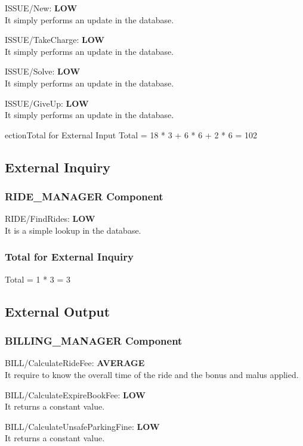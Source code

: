 \documentclass[11pt]{article} %
\newcommand{\extInput}[3]{ #1:  \textbf{#2} \\ #3  }
\begin{document}
\begin{description}
	\item \extInput
		{ISSUE/New}
		{LOW}
		{It simply performs an update in the database.}
	\item \extInput
		{ISSUE/TakeCharge}
		{LOW}
		{It simply performs an update in the database.}
	\item \extInput
		{ISSUE/Solve}
		{LOW}
		{It simply performs an update in the database.}
	\item \extInput
		{ISSUE/GiveUp}
		{LOW}
		{It simply performs an update in the database.}
\end{description}

\subsubs
ection{Total for External Input}
Total = 18 * 3 + 6 * 6 + 2 * 6 =  102

\subsection{External Inquiry}

\subsubsection{RIDE\_MANAGER Component}
\begin{description}
	\item \extInput
		{RIDE/FindRides}
		{LOW}
		{It is a simple lookup in the database.}
\end{description}

\subsubsection{Total for External Inquiry}
Total = 1 * 3 = 3

\subsection{External Output}

\subsubsection{BILLING\_MANAGER Component}
\begin{description}
	\item \extInput
		{BILL/CalculateRideFee}
		{AVERAGE}
		{It require to know the overall time of the ride and the bonus and malus applied.}
	\item \extInput
		{BILL/CalculateExpireBookFee}
		{LOW}
		{It returns a constant value.}
	\item \extInput
		{BILL/CalculateUnsafeParkingFine}
		{LOW}
		{It returns a constant value.}
\end{description}
\end{document}
